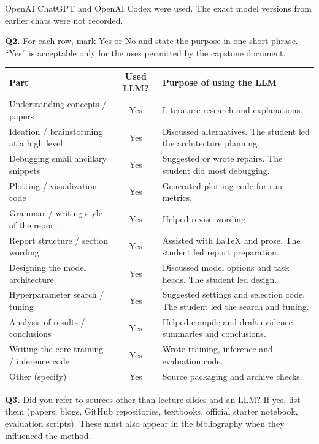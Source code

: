 \documentclass[11pt, oneside]{article}
\begin{document}
OpenAI ChatGPT and OpenAI Codex were used. The exact model versions from earlier chats were not recorded.

\textbf{Q2.} For each row, mark Yes or No and state the purpose in one short phrase. ``Yes'' is acceptable only for the uses permitted by the capstone document.

\begin{table}[H]
\centering\small
\begin{tabular}{>{\raggedright\arraybackslash}p{4.6cm}|c|>{\raggedright\arraybackslash}p{7.2cm}}
\toprule
Part & Used LLM? & Purpose of using the LLM \\
\midrule
Understanding concepts / papers & Yes & Literature research and explanations. \\
Ideation / brainstorming at a high level & Yes & Discussed alternatives. The student led the architecture planning. \\
Debugging small ancillary snippets & Yes & Suggested or wrote repairs. The student did most debugging. \\
Plotting / visualization code & Yes & Generated plotting code for run metrics. \\
Grammar / writing style of the report & Yes & Helped revise wording. \\
Report structure / section wording & Yes & Assisted with LaTeX and prose. The student led report preparation. \\
Designing the model architecture & Yes & Discussed model options and task heads. The student led design. \\
Hyperparameter search / tuning & Yes & Suggested settings and selection code. The student led the search and tuning. \\
Analysis of results / conclusions & Yes & Helped compile and draft evidence summaries and conclusions. \\
Writing the core training / inference code & Yes & Wrote training, inference and evaluation code. \\
Other (specify) & Yes & Source packaging and archive checks. \\
\bottomrule
\end{tabular}
\end{table}

\textbf{Q3.} Did you refer to sources other than lecture slides and an LLM? If yes, list them (papers, blogs, GitHub repositories, textbooks, official starter notebook, evaluation scripts). These must also appear in the bibliography when they influenced the method.
\end{document}
